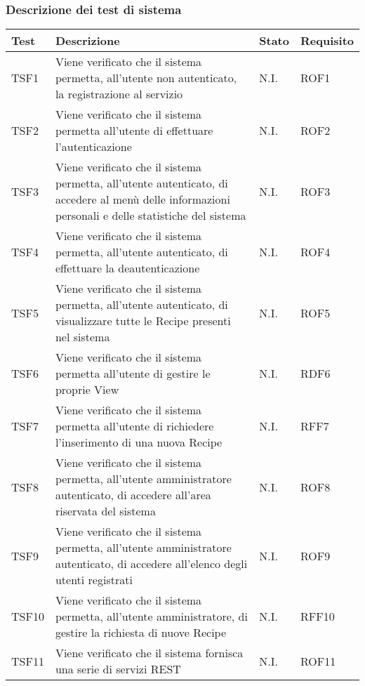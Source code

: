 		\subsubsection{Descrizione dei test di sistema}
			\begin{center}

			\def\arraystretch{1.5}
			\bgroup
			\begin{longtable}{| p{2cm} | p{7cm} | p{1.5cm} | p{2cm} |}
					\hline
					\textbf{Test} & \textbf{Descrizione} & \textbf{Stato} & \textbf{Requisito}\\
					\hline						
					TSF1 & Viene verificato che il sistema permetta, all'utente non autenticato, la registrazione al servizio & N.I. & ROF1\\
					\hline
					TSF2 & Viene verificato che il sistema permetta all'utente di effettuare l'autenticazione & N.I. & ROF2\\
					\hline
					TSF3 & Viene verificato che il sistema permetta, all'utente autenticato, di accedere al menù delle informazioni personali e delle statistiche del sistema & N.I. & ROF3\\
					\hline
					TSF4 & Viene verificato che il sistema permetta, all'utente autenticato, di effettuare la deautenticazione & N.I. & ROF4\\
					\hline
					TSF5 & Viene verificato che il sistema permetta, all'utente autenticato, di visualizzare tutte le Recipe presenti nel sistema & N.I. & ROF5\\
					\hline
					TSF6 & Viene verificato che il sistema permetta all'utente di gestire le proprie View & N.I. & RDF6\\
					\hline
					TSF7 & Viene verificato che il sistema permetta all'utente di richiedere l'inserimento di una nuova Recipe & N.I. & RFF7\\
					\hline
					TSF8 & Viene verificato che il sistema permetta, all'utente amministratore autenticato, di accedere all'area riservata del sistema & N.I. & ROF8\\
					\hline
					TSF9 & Viene verificato che il sistema permetta, all'utente amministratore autenticato, di accedere all'elenco degli utenti registrati & N.I. & ROF9\\
					\hline
					TSF10 & Viene verificato che il sistema permetta, all'utente amministratore, di gestire la richiesta di nuove Recipe & N.I. & RFF10\\
					\hline
					TSF11 & Viene verificato che il sistema fornisca una serie di servizi REST & N.I. & ROF11\\

\end{longtable}
\end{center}
